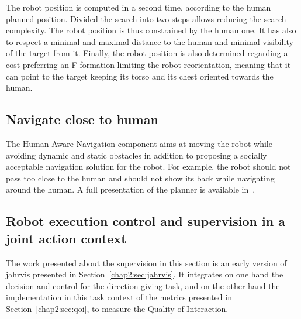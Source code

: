 \documentclass[a4paper,11pt,twoside]{StyleThese}
\begin{document}
The robot position is computed in a second time, according to the human planned position. Divided the search into two steps allows reducing the search complexity. The robot position is thus constrained by the human one. It has also to respect a minimal and maximal distance to the human and minimal visibility of the target from it. Finally, the robot position is also determined regarding a cost preferring an F-formation limiting the robot reorientation, meaning that it can point to the target keeping its torso and its chest oriented towards the human.


\subsection{Navigate close to human}\label{subsec:navigation}

The Human-Aware Navigation component aims at moving the robot while avoiding dynamic and static obstacles in addition to proposing a socially acceptable navigation solution for the robot. For example, the robot should not pass too close to the human and should not show its back while navigating around the human. A full presentation of the planner is available in~\cite{singamaneni_2020_hateb}.

\subsection{Robot execution control and supervision in a joint action context}\label{subsec:supervision}

The work presented about the supervision in this section is an early version of \acrfull{jahrvis} presented in Section~\ref{chap2:sec:jahrvis}. It integrates on one hand the decision and control for the direction-giving task, and on the other hand the implementation in this task context of the metrics presented in Section~\ref{chap2:sec:qoi}, to measure the Quality of Interaction.
\end{document}
